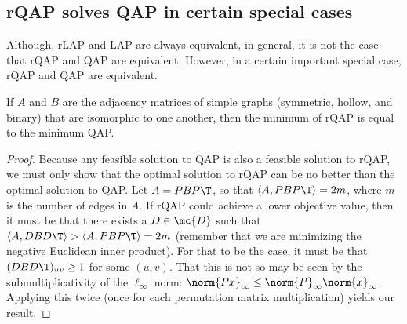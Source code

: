 \documentclass[10pt,journal,cspaper,compsoc]{IEEEtran}
\begin{document}



\subsection{rQAP solves QAP in certain special cases} %
\label{sub:rqap_solves_qap_}

Although, rLAP and LAP are always equivalent, in general, it is not the case that rQAP and QAP are equivalent.  However, in a certain important special case, rQAP and QAP are equivalent.
\begin{thm}
	If $A$ and $B$ are the adjacency matrices of simple graphs (symmetric, hollow, and binary) that are isomorphic to one another, then the minimum of rQAP is equal to the minimum QAP.
\end{thm}
\begin{proof}
Because any feasible solution to QAP is also a feasible solution to rQAP, we must only show that the optimal solution to rQAP can be no better than the optimal solution to QAP.  Let $A=PBP\T$, so that $\langle A, PBP\T\rangle=2m$, where $m$ is the number of edges in $A$.  If rQAP could achieve a lower objective value, then it must be that there exists a $D \in \mc{D}$ such that $\langle A, DBD\T\rangle > \langle A, PBP\T\rangle = 2m$ (remember that we are minimizing the negative Euclidean inner product). For that to be the case, it must be that $(DBD\T)_{uv} \geq 1$ for some $(u,v)$.  That this is not so may be seen by the submultiplicativity of the $\ell_{\infty}$ norm:
$\norm{Px}_\infty \leq \norm{P}_\infty \norm{x}_\infty$.  Applying this twice (once for each permutation matrix multiplication) yields our result.
\end{proof}
\end{document}

